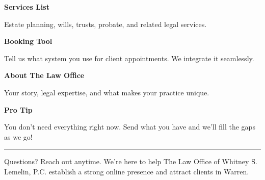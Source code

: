 \documentclass[11pt,letterpaper]{article}
\begin{document}
\hfill
\begin{minipage}[t]{0.48\textwidth}
\begin{tcolorbox}[colframe=accent-teal, boxrule=1pt, left=0.7em, right=0.7em, top=0.5em, bottom=0.5em, arc=4pt, boxsep=0pt]
{\bfseries\small\color{accent-teal}Services List}

\vspace{0.15em}

{\small Estate planning, wills, trusts, probate, and related legal services.}
\end{tcolorbox}

\vspace{0.1em}

\begin{tcolorbox}[colframe=accent-teal, boxrule=1pt, left=0.7em, right=0.7em, top=0.5em, bottom=0.5em, arc=4pt, boxsep=0pt]
{\bfseries\small\color{accent-teal}Booking Tool}

\vspace{0.15em}

{\small Tell us what system you use for client appointments. We integrate it seamlessly.}
\end{tcolorbox}

\vspace{0.1em}

\begin{tcolorbox}[colframe=accent-teal, boxrule=1pt, left=0.7em, right=0.7em, top=0.5em, bottom=0.5em, arc=4pt, boxsep=0pt]
{\bfseries\small\color{accent-teal}About The Law Office}

\vspace{0.15em}

{\small Your story, legal expertise, and what makes your practice unique.}
\end{tcolorbox}

\vspace{-0.2em}
\end{minipage}

\vspace{0.15em}

\begin{tcolorbox}[colback={accent-red!5}, colframe=accent-red!20, boxrule=0.5pt, left=0.7em, right=0.7em, top=0.4em, bottom=0.4em, arc=6pt, boxsep=0pt]

{\bfseries\small\color{accent-red}Pro Tip}

\vspace{0.1em}

{\small You don't need everything right now. Send what you have and we'll fill the gaps as we go!}

\end{tcolorbox}

\vspace{0.15em}

\noindent\hrule
\vspace{0.2em}

{\small\color{text-light}Questions? Reach out anytime. We're here to help The Law Office of Whitney S. Lemelin, P.C. establish a strong online presence and attract clients in Warren.}
\end{document}
